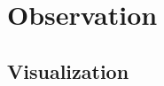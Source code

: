 \documentclass[suppldata, dvipdfmx]{interact}
\theoremstyle{plain}%
\theoremstyle{definition}
\theoremstyle{remark}
\theoremstyle{problemstyle}
\begin{document}
%
%

\section{Observation}

\subsection{Visualization}
\end{document}
